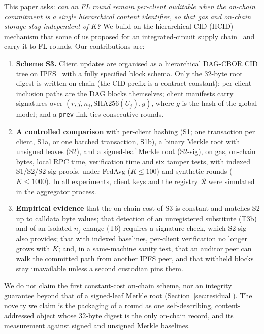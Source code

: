 \documentclass[final,3p,times,twocolumn]{elsarticle}
\newcommand{\Sa}{S1a}\newcommand{\Sb}{S1b}
\begin{document}
This paper asks: \emph{can an FL round remain per-client auditable when the on-chain commitment is a single hierarchical content identifier, so that gas and on-chain storage stay independent of $K$?} We build on the hierarchical CID (HCID) mechanism that some of us proposed for an integrated-circuit supply chain~\cite{trustchain} and carry it to FL rounds. Our contributions are:
\begin{enumerate}
\item \textbf{Scheme S3.} Client updates are organised as a hierarchical DAG-CBOR CID tree on IPFS~\cite{benet} with a fully specified block schema. Only the 32-byte root digest is written on-chain (the CID prefix is a contract constant); per-client inclusion paths are the DAG blocks themselves; client manifests carry signatures over $(r,j,n_j,\mathrm{SHA256}(U_j),g)$, where $g$ is the hash of the global model; and a \texttt{prev} link ties consecutive rounds.
\item \textbf{A controlled comparison} with per-client hashing (S1; one transaction per client, \Sa, or one batched transaction, \Sb), a binary Merkle root with unsigned leaves (S2), and a signed-leaf Merkle root (S2-sig), on gas, on-chain bytes, local RPC time, verification time and six tamper tests, with indexed S1/S2/S2-sig proofs, under FedAvg ($K\le100$) and synthetic rounds ($K\le1000$). In all experiments, client keys and the registry $\mathcal{R}$ were simulated in the aggregator process.
\item \textbf{Empirical evidence} that the on-chain cost of S3 is constant and matches S2 up to calldata byte values; that detection of an unregistered substitute (T3b) and of an isolated $n_j$ change (T6) requires a signature check, which S2-sig also provides; that with indexed baselines, per-client verification no longer grows with $K$; and, in a same-machine sanity test, that an auditor peer can walk the committed path from another IPFS peer, and that withheld blocks stay unavailable unless a second custodian pins them.
\end{enumerate}
We do not claim the first constant-cost on-chain scheme, nor an integrity guarantee beyond that of a signed-leaf Merkle root (Section~\ref{sec:residual}). The novelty we claim is the packaging of a round as one self-describing, content-addressed object whose 32-byte digest is the only on-chain record, and its measurement against signed and unsigned Merkle baselines.
\end{document}
